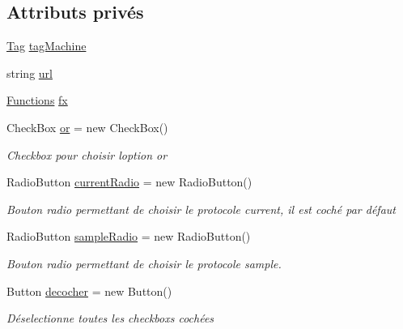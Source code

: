 \subsection*{Attributs privés}
\begin{DoxyCompactItemize}
\item 
\mbox{\hyperlink{class_m_t_connect_agent_1_1_model_1_1_tag}{Tag}} \mbox{\hyperlink{class_m_t_connect_agent_1_1_user_control_display_tab_adb85fd45a6e04656bf4eed212040e1a9}{tag\+Machine}}
\item 
string \mbox{\hyperlink{class_m_t_connect_agent_1_1_user_control_display_tab_aadac9f472866bf956cae2bd897200e1a}{url}}
\item 
\mbox{\hyperlink{class_m_t_connect_agent_1_1_user_control_display_tab_a39c6241e9b8ef40634f8340676d557ec}{Functions}} \mbox{\hyperlink{class_m_t_connect_agent_1_1_user_control_display_tab_addffe628fc1709f3f186bdaa1946e558}{fx}}
\item 
Check\+Box \mbox{\hyperlink{class_m_t_connect_agent_1_1_user_control_display_tab_a31fcb431f108a7067f9293700d985a7b}{or}} = new Check\+Box()
\begin{DoxyCompactList}\small\item\em Checkbox pour choisir l\textquotesingle{}option or \end{DoxyCompactList}\item 
Radio\+Button \mbox{\hyperlink{class_m_t_connect_agent_1_1_user_control_display_tab_ae9cb8140db2e3be2016b811f1df7010a}{current\+Radio}} = new Radio\+Button()
\begin{DoxyCompactList}\small\item\em Bouton radio permettant de choisir le protocole current, il est coché par défaut \end{DoxyCompactList}\item 
Radio\+Button \mbox{\hyperlink{class_m_t_connect_agent_1_1_user_control_display_tab_afd8149a27f0eca9e61e12880fce8bdc9}{sample\+Radio}} = new Radio\+Button()
\begin{DoxyCompactList}\small\item\em Bouton radio permettant de choisir le protocole sample. \end{DoxyCompactList}\item 
Button \mbox{\hyperlink{class_m_t_connect_agent_1_1_user_control_display_tab_a0dfedd189ce40e92ee9621a790ec5b9f}{decocher}} = new Button()
\begin{DoxyCompactList}\small\item\em Déselectionne toutes les checkboxs cochées \end{DoxyCompactList}\item 

\end{DoxyCompactItemize}
